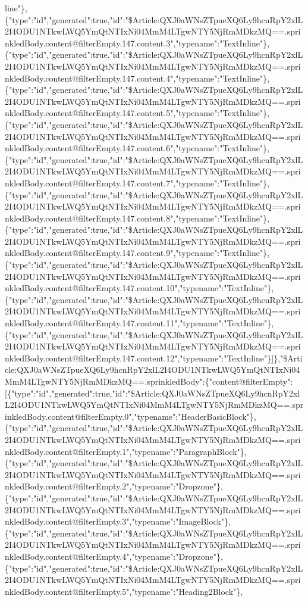 line"\},\{"type":"id","generated":true,"id":"\$Article:QXJ0aWNsZTpueXQ6Ly9hcnRpY2xlL2I4ODU1NTkwLWQ5YmQtNTIxNi04MmM4LTgwNTY5NjRmMDkzMQ==.sprinkledBody.content@filterEmpty.147.content.3","typename":"TextInline"\},\{"type":"id","generated":true,"id":"\$Article:QXJ0aWNsZTpueXQ6Ly9hcnRpY2xlL2I4ODU1NTkwLWQ5YmQtNTIxNi04MmM4LTgwNTY5NjRmMDkzMQ==.sprinkledBody.content@filterEmpty.147.content.4","typename":"TextInline"\},\{"type":"id","generated":true,"id":"\$Article:QXJ0aWNsZTpueXQ6Ly9hcnRpY2xlL2I4ODU1NTkwLWQ5YmQtNTIxNi04MmM4LTgwNTY5NjRmMDkzMQ==.sprinkledBody.content@filterEmpty.147.content.5","typename":"TextInline"\},\{"type":"id","generated":true,"id":"\$Article:QXJ0aWNsZTpueXQ6Ly9hcnRpY2xlL2I4ODU1NTkwLWQ5YmQtNTIxNi04MmM4LTgwNTY5NjRmMDkzMQ==.sprinkledBody.content@filterEmpty.147.content.6","typename":"TextInline"\},\{"type":"id","generated":true,"id":"\$Article:QXJ0aWNsZTpueXQ6Ly9hcnRpY2xlL2I4ODU1NTkwLWQ5YmQtNTIxNi04MmM4LTgwNTY5NjRmMDkzMQ==.sprinkledBody.content@filterEmpty.147.content.7","typename":"TextInline"\},\{"type":"id","generated":true,"id":"\$Article:QXJ0aWNsZTpueXQ6Ly9hcnRpY2xlL2I4ODU1NTkwLWQ5YmQtNTIxNi04MmM4LTgwNTY5NjRmMDkzMQ==.sprinkledBody.content@filterEmpty.147.content.8","typename":"TextInline"\},\{"type":"id","generated":true,"id":"\$Article:QXJ0aWNsZTpueXQ6Ly9hcnRpY2xlL2I4ODU1NTkwLWQ5YmQtNTIxNi04MmM4LTgwNTY5NjRmMDkzMQ==.sprinkledBody.content@filterEmpty.147.content.9","typename":"TextInline"\},\{"type":"id","generated":true,"id":"\$Article:QXJ0aWNsZTpueXQ6Ly9hcnRpY2xlL2I4ODU1NTkwLWQ5YmQtNTIxNi04MmM4LTgwNTY5NjRmMDkzMQ==.sprinkledBody.content@filterEmpty.147.content.10","typename":"TextInline"\},\{"type":"id","generated":true,"id":"\$Article:QXJ0aWNsZTpueXQ6Ly9hcnRpY2xlL2I4ODU1NTkwLWQ5YmQtNTIxNi04MmM4LTgwNTY5NjRmMDkzMQ==.sprinkledBody.content@filterEmpty.147.content.11","typename":"TextInline"\},\{"type":"id","generated":true,"id":"\$Article:QXJ0aWNsZTpueXQ6Ly9hcnRpY2xlL2I4ODU1NTkwLWQ5YmQtNTIxNi04MmM4LTgwNTY5NjRmMDkzMQ==.sprinkledBody.content@filterEmpty.147.content.12","typename":"TextInline"\}{]}\},"\$Article:QXJ0aWNsZTpueXQ6Ly9hcnRpY2xlL2I4ODU1NTkwLWQ5YmQtNTIxNi04MmM4LTgwNTY5NjRmMDkzMQ==.sprinkledBody":\{"content@filterEmpty":{[}\{"type":"id","generated":true,"id":"\$Article:QXJ0aWNsZTpueXQ6Ly9hcnRpY2xlL2I4ODU1NTkwLWQ5YmQtNTIxNi04MmM4LTgwNTY5NjRmMDkzMQ==.sprinkledBody.content@filterEmpty.0","typename":"HeaderBasicBlock"\},\{"type":"id","generated":true,"id":"\$Article:QXJ0aWNsZTpueXQ6Ly9hcnRpY2xlL2I4ODU1NTkwLWQ5YmQtNTIxNi04MmM4LTgwNTY5NjRmMDkzMQ==.sprinkledBody.content@filterEmpty.1","typename":"ParagraphBlock"\},\{"type":"id","generated":true,"id":"\$Article:QXJ0aWNsZTpueXQ6Ly9hcnRpY2xlL2I4ODU1NTkwLWQ5YmQtNTIxNi04MmM4LTgwNTY5NjRmMDkzMQ==.sprinkledBody.content@filterEmpty.2","typename":"Dropzone"\},\{"type":"id","generated":true,"id":"\$Article:QXJ0aWNsZTpueXQ6Ly9hcnRpY2xlL2I4ODU1NTkwLWQ5YmQtNTIxNi04MmM4LTgwNTY5NjRmMDkzMQ==.sprinkledBody.content@filterEmpty.3","typename":"ImageBlock"\},\{"type":"id","generated":true,"id":"\$Article:QXJ0aWNsZTpueXQ6Ly9hcnRpY2xlL2I4ODU1NTkwLWQ5YmQtNTIxNi04MmM4LTgwNTY5NjRmMDkzMQ==.sprinkledBody.content@filterEmpty.4","typename":"Dropzone"\},\{"type":"id","generated":true,"id":"\$Article:QXJ0aWNsZTpueXQ6Ly9hcnRpY2xlL2I4ODU1NTkwLWQ5YmQtNTIxNi04MmM4LTgwNTY5NjRmMDkzMQ==.sprinkledBody.content@filterEmpty.5","typename":"Heading2Block"\},\